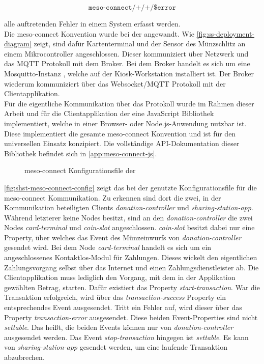 \[\texttt{meso-connect/+/+/\$error} \]

alle auftretenden Fehler in einem System erfasst werden.\\

Die meso-connect Konvention wurde bei der \shst{} angewandt. Wie \autoref{fig:ss-deployment-diagram} zeigt,
sind dafür Kartenterminal und der Sensor des Münzschlitz an einem Mikrocontroller angeschlossen. Dieser
kommuniziert über Netzwerk und das MQTT Protokoll mit dem Broker. Bei dem Broker handelt es sich um 
eine Mosquitto-Instanz \cite{mosquitto}, welche auf der Kiosk-Workstation installiert ist. 
Der Broker wiederum kommuniziert über das Websocket/MQTT Protokoll
mit der Clientapplikation.\\
Für die eigentliche Kommunikation über das Protokoll wurde im Rahmen dieser Arbeit und für die Clientapplikation 
der \shst{} eine JavaScript Bibliothek implementiert, welche in einer Browser- oder Node.js-Anwendung
nutzbar ist. Diese implementiert die gesamte meso-connect Konvention und ist für den universellen Einsatz
konzipiert. Die vollständige API-Dokumentation dieser Bibliothek befindet sich in \autoref{app:meso-connect-js}.

\begin{figure}
  
  \caption{meso-connect Konfigurationsfile der \shst{}}
  \label{fig:shst-meso-connect-config}
\end{figure}

\autoref{fig:shst-meso-connect-config} zeigt das bei der \shst{} genutzte Konfigurationsfile für die 
meso-connect Kommunikation. Zu erkennen sind dort die zwei, in der Kommunikation beteiligten Clients
\emph{donation-controller} und \emph{sharing-station-app}. Während letzterer keine Nodes
besitzt, sind an den \emph{donation-controller} die zwei Nodes \emph{card-terminal} und 
\emph{coin-slot} angeschlossen. \emph{coin-slot} besitzt dabei nur eine Property, über
welches das Event des Münzeinwurfs von \emph{donation-controller} gesendet wird. Bei dem Node
\emph{card-terminal} handelt es sich um ein angeschlossenes Kontaktlos-Modul für Zahlungen. Dieses wickelt
den eigentlichen Zahlungsvorgang selbst über das Internet und einen Zahlungsdienstleister ab. 
Die Clientapplikation muss lediglich den Vorgang, mit dem in der Applikation gewählten Betrag,
starten. Dafür existiert das Property \emph{start-transaction}. War die Transaktion erfolgreich,
wird über das \emph{transaction-success} Property ein entsprechendes Event ausgesendet. Tritt ein 
Fehler auf, wird dieser über das Property \emph{transaction-error} ausgesendet. Diese beiden Event-Properties
sind nicht \emph{settable}. Das heißt, die beiden Events können nur von \emph{donation-controller} ausgesendet
werden. Das Event \emph{stop-transaction} hingegen ist \emph{settable}. 
Es kann von \emph{sharing-station-app} gesendet werden, um eine laufende Transaktion abzubrechen. 


\iffalse
- Konfigurationsfile, Beispiel der JS Bib 
- JS API Dokumentation in den Anhang
\fi